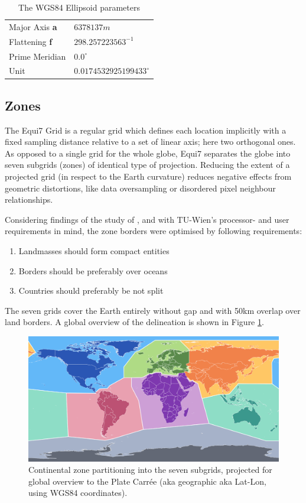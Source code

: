 \documentclass[11pt,a4paper]{article}
\begin{document}
\begin{table}[hbtp]
\centering
	{
	\begin{tabular}{ll}
	\hline 
	Major Axis \textbf{a} & $6378137 m$ \\
	Flattening \textbf{f} & $298.257223563^{-1}$ \\
	Prime Meridian & $0.0^{\circ}$ \\
	Unit & $0.0174532925199433^{\circ}$ \\
	\hline 
	\end{tabular} 
	}
\caption[Map Projections]{
The WGS84 Ellipsoid parameters
}
\label{tab:wgs84}
\end{table}

\subsection{Zones}
The Equi7 Grid is a regular grid which defines each location implicitly with a fixed sampling distance relative to a set of linear axis; here two orthogonal ones. As opposed to a single grid for the whole globe, Equi7 separates the globe into seven subgrids (zones) of identical type of projection. Reducing the extent of a projected grid (in respect to the Earth curvature) reduces negative effects from geometric distortions, like data oversampling or disordered pixel neighbour relationships.

Considering findings of the study of \citep{Bauer-Marschallinger2014}, and with TU-Wien's processor- and user requirements in mind, the zone borders were optimised by following requirements: 
\begin{enumerate}
\item Landmasses should form compact entities
\item Borders should be preferably over oceans
\item Countries should preferably be not split
\end{enumerate}

The seven grids cover the Earth entirely without gap and with 50km overlap over land borders. A global overview of the delineation is shown in Figure \ref{fig:gridzones}.

\begin{figure}[hbtp]
\centering
\includegraphics[width=1.0\textwidth]{equi7_grid_v11_overview}
\caption{
Continental zone partitioning into the seven subgrids, projected for global overview to the Plate Carr\'{e}e (aka geographic aka Lat-Lon, using WGS84 coordinates).
}
\label{fig:gridzones}
\end{figure}
\end{document}
